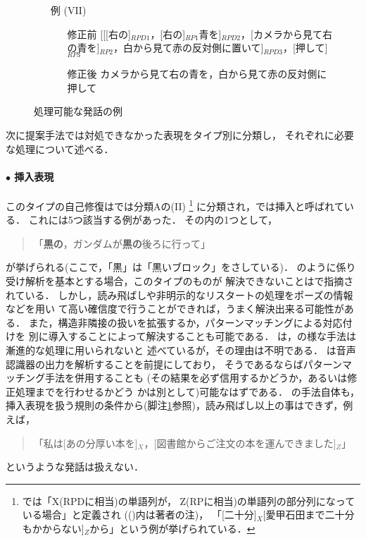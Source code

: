\begin{figure}
\begin{enumerate}
\item[例] (VII)
  \begin{enumerate}
  \item[修正前 ]  [[[右の]$_{RPD1}$，[右の]$_{RP1}$青を]$_{RPD2}$，[カメラから見て右の青を]$_{RP2}$，白から見て赤の反対側に置いて]$_{RPD3}$，[押して]$_{RP3}$
  \item[修正後 ]  カメラから見て右の青を，白から見て赤の反対側に押して
 \end{enumerate}

\end{enumerate}
\caption{処理可能な発話の例}
\label{fig:successful}
\end{figure}



次に提案手法では対処できなかった表現をタイプ別に分類し，
それぞれに必要な処理について述べる．

\paragraph*{$\bullet$ 挿入表現}
このタイプの自己修復は\cite{NM1998}では分類Aの(II)
\footnote{\label{NM1998_CAT:A-II}
\cite{NM1998}では「X(RPDに相当)の単語列が，
Z(RPに相当)の単語列の部分列になっている場合」と定義され
(()内は著者の注)，
「[二十分]$_{X}$[愛甲石田まで二十分もかからない]$_{Z}$から」という例が挙げられている．
}
に分類され，\cite{TH1999}では挿入と呼ばれている．
これには5つ該当する例があった．
その内の1つとして，
\begin{quote}
「{\bf 黒の}，ガンダムが{\bf 黒の}後ろに行って」
\end{quote}
が挙げられる(ここで，「黒」は「黒いブロック」をさしている)．
\cite{DY1997}のように係り受け解析を基本とする場合，このタイプのものが
解決できないことは\cite{NM1998}で指摘されている．
しかし，読み飛ばしや非明示的なリスタートの処理をポーズの情報などを用い
て高い確信度で行うことができれば，うまく解決出来る可能性がある．
また，構造非隣接の扱いを拡張するか，パターンマッチングによる対応付けを
別に導入することによって解決することも可能である．
\cite{NM1998}は，\cite{HP1997}の様な手法は漸進的な処理に用いられないと
述べているが，その理由は不明である．
\cite{NM1998}は音声認識器の出力を解析することを前提にしており，
そうであるならばパターンマッチング手法を併用することも
(その結果を必ず信用するかどうか，あるいは修正処理までを行わせるかどう
かは別として)可能なはずである．
\cite{NM1998}の手法自体も，挿入表現を扱う規則の条件から(脚注\ref{NM1998_CAT:A-II}参照)，読み飛ばし以上の事はできず，例えば，
\begin{quote}
「私は[あの分厚い本を]$_{X}$，[図書館からご注文の本を運んできました]$_{Z}$」
\end{quote}
というような発話は扱えない．

